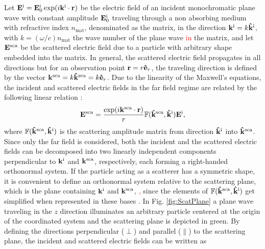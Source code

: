 
Let $\vb{E}^\text{i} = \vb{E}^\text{i}_0 \exp(i\vb{k}^\text{i}\cdot\vb{r})$ be the electric field of an incident monochromatic plane wave with constant amplitude $\vb{E}_0^\text{i}$  traveling through a non absorbing medium with refractive index $n_\text{mat}$, denominated as the matrix, in the direction $\vb{k}^\text{i} = k\vu{k}^\text{i}$, with $k = (\omega/c)n_\text{mat}$ the wave number of the plane wave \textcolor{red}{in} the matrix, and let $\vb{E}^\text{sca}$ be the scattered electric field due to a particle with arbitrary shape embedded into the matrix. In general, the scattered electric field propagates in all directions but for an observation point $\vb{r} = r\vu{e}_r$, the traveling direction is defined by the vector $\vb{k}^\text{sca} = k\vu{k}^\text{sca} = k\vu{e}_r$.  Due to the linearity of the Maxwell's equations,   the incident and scattered electric fields  in the far field regime are related by the following linear relation \cite{tsang_scattering_2000}:
%
%
 \begin{equation}
	\vb{E}^\text{sca} =   \frac{\exp(i\vb{k}^\text{sca}\cdot\vb{r})}{r} \mathbb{F}(\vu{k}^\text{sca}, \vu{k}^\text{i}) \vb{E}^\text{i},
 \label{eq:ScatAmpMat}
 \end{equation}
%
where $\mathbb{F}(\vu{k}^\text{sca}, \vu{k}^\text{i})$ is the scattering  amplitude matrix from direction $\vu{k}^\text{i}$ into $\vu{k}^\text{sca}$. Since only the far field is considered, both the incident and the scattered electric fields can be decomposed into two linearly independent components perpendicular to $\vb{k}^\text{i}$ and $\vb{k}^\text{sca}$, respectively, each forming a right-handed orthonormal system. If the particle acting as a scatterer has a symmetric shape, it is convenient to define an orthonormal system relative to the scattering plane, which is the plane containing $\vb{k}^\text{i}$ and $\vb{k}^\text{sca}$, \textcolor{red}{,} since the elements of $\mathbb{F}(\vu{k}^\text{sca}, \vu{k}^\text{i})$ get simplified when represented in these bases \cite{tsang_scattering_2000}. In Fig. \ref{fig:ScatPlane} a plane wave traveling in the $z$ direction illuminates an arbitrary particle centered at the origin of the coordinated system and the scattering plane is depicted in green. By defining the directions perpendicular  ($\perp$) and parallel ($\parallel$) to the scattering plane,  the incident and scattered electric fields can be written as
